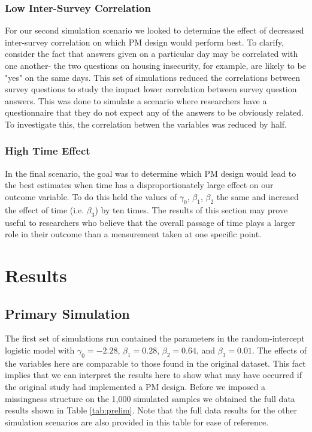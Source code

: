 \documentclass{svjour3}\usepackage[]{graphicx}\usepackage[]{color}
\begin{document}
\subsubsection{Low Inter-Survey Correlation}
For our second simulation scenario we looked to determine the effect of decreased inter-survey correlation on which PM design would perform best. To clarify, consider the fact that answers given on a particular day may be correlated with one another- the two questions on housing insecurity, for example, are likely to be "yes" on the same days. This set of simulations reduced the correlations between survey questions to study the impact lower correlation between survey question answers.  This was done to simulate a scenario where researchers have a questionnaire that they do not expect any of the answers to be obviously related. To investigate this, the correlation betwen the variables was reduced by half.\par

\subsubsection{High Time Effect}
In the final scenario, the goal was to determine which PM design would lead to the best estimates when time has a disproportionately large effect on our outcome variable. To do this held the values of $\gamma_0$, $\beta_1$, $\beta_2$ the same and increaed the effect of time (i.e. $\beta_3$) by ten times.  The results of this section may prove useful to researchers who believe that the overall passage of time plays a larger role in their outcome than a measurement taken at one specific point. \par

\section{Results}
\label{sec:3}
\subsection{Primary Simulation}
\label{sec:3.1}
The first set of simulations run contained the parameters in the random-intercept logistic model with $\gamma_0 = -2.28$, $\beta_1 = 0.28$, $\beta_2 = 0.64$, and $\beta_3 = 0.01$. The effects of the variables here are comparable to those found in the original dataset. This fact implies that we can interpret the results here to show what may have occurred if the original study had implemented a PM design. Before we imposed a missingness structure on the 1,000 simulated samples we obtained the full data results shown in Table \ref{tab:prelim}. Note that the full data results for the other simulation scenarios are also provided in this table for ease of reference.
\end{document}
